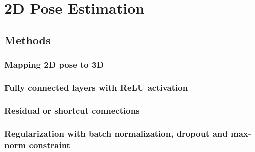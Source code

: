 
\chapter{2D Pose Estimation}\label{chapter:2dpose}

\section{Methods}

\subsection{Mapping 2D pose to 3D}
\subsection{Fully connected layers with ReLU activation}
\subsection{Residual or shortcut connections}
\subsection{Regularization with batch normalization, dropout and
max-norm constraint}
